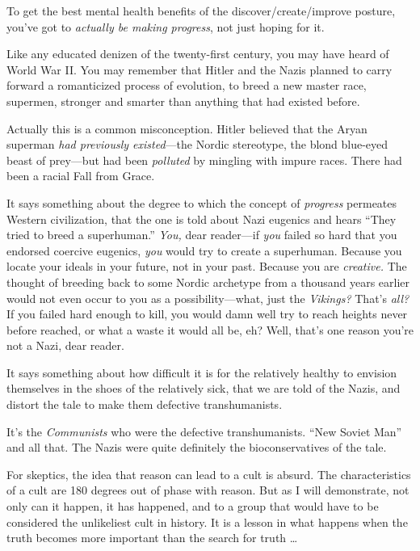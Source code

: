{
 To get the best mental health benefits of the
discover/create/improve posture, you've got to
\textit{actually be making progress}, not just hoping for it.}

\myendsectiontext


\bigskip


{
 Like any educated denizen of the twenty-first century, you may
have heard of World War II. You may remember that Hitler and the Nazis
planned to carry forward a romanticized process of evolution, to breed
a new master race, supermen, stronger and smarter than anything that
had existed before. }

{
 Actually this is a common misconception. Hitler believed that the
Aryan superman \textit{had previously existed}{}---the Nordic
stereotype, the blond blue-eyed beast of prey---but had been
\textit{polluted} by mingling with impure races. There had been a
racial Fall from Grace.}

{
 It says something about the degree to which the concept of
\textit{progress} permeates Western civilization, that the one is told
about Nazi eugenics and hears ``They tried to breed a
superhuman.'' \textit{You,} dear reader---if
\textit{you} failed so hard that you endorsed coercive eugenics,
\textit{you} would try to create a superhuman. Because you locate your
ideals in your future, not in your past. Because you are
\textit{creative.} The thought of breeding back to some Nordic
archetype from a thousand years earlier would not even occur to you as
a possibility---what, just the \textit{Vikings?} That's
\textit{all?} If you failed hard enough to kill, you would damn well
try to reach heights never before reached, or what a waste it would all
be, eh? Well, that's one reason you're
not a Nazi, dear reader.}

{
 It says something about how difficult it is for the relatively
healthy to envision themselves in the shoes of the relatively sick,
that we are told of the Nazis, and distort the tale to make them
defective transhumanists.}

{
 It's the \textit{Communists} who were the
defective transhumanists. ``New Soviet
Man'' and all that. The Nazis were quite definitely
the bioconservatives of the tale.}

\myendsectiontext


{
 For skeptics, the idea that reason can lead to a cult is absurd.
The characteristics of a cult are 180 degrees out of phase with reason.
But as I will demonstrate, not only can it happen, it has happened, and
to a group that would have to be considered the unlikeliest cult in
history. It is a lesson in what happens when the truth becomes more
important than the search for truth \ldots}

